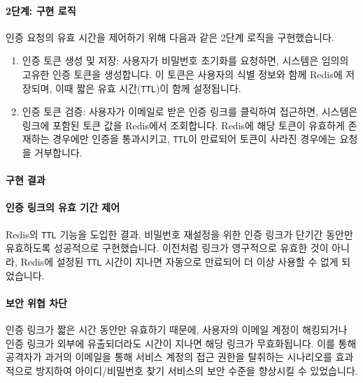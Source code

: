 \documentclass[12pt,a4paper]{article}
\begin{document}
    \paragraph{2단계: 구현 로직} \par
    인증 요청의 유효 시간을 제어하기 위해 다음과 같은 2단계 로직을 구현했습니다.\\
    \begin{enumerate}
        \item 인증 토큰 생성 및 저장: 사용자가 비밀번호 초기화를 요청하면, 시스템은 임의의 고유한 인증 토큰을 생성합니다. 이 토큰은 사용자의 식별 정보와 함께 Redis에 저장되며, 이때 짧은 유효 시간(\texttt{TTL})이 함께 설정됩니다.
        \item 인증 토큰 검증: 사용자가 이메일로 받은 인증 링크를 클릭하여 접근하면, 시스템은 링크에 포함된 토큰 값을 Redis에서 조회합니다. Redis에 해당 토큰이 유효하게 존재하는 경우에만 인증을 통과시키고, \texttt{TTL}이 만료되어 토큰이 사라진 경우에는 요청을 거부합니다.
    \end{enumerate}

    \par


    \paragraph{구현 결과}



    \paragraph{인증 링크의 유효 기간 제어} \par
    Redis의 \texttt{TTL} 기능을 도입한 결과, 비밀번호 재설정을 위한 인증 링크가 단기간 동안만 유효하도록 성공적으로 구현했습니다. 이전처럼 링크가 영구적으로 유효한 것이 아니라, Redis에 설정된 \texttt{TTL} 시간이 지나면 자동으로 만료되어 더 이상 사용할 수 없게 되었습니다.\\

    \vspace{1em}


    \paragraph{보안 위협 차단} \par
    인증 링크가 짧은 시간 동안만 유효하기 때문에, 사용자의 이메일 계정이 해킹되거나 인증 링크가 외부에 유출되더라도 시간이 지나면 해당 링크가 무효화됩니다. 이를 통해 공격자가 과거의 이메일을 통해 서비스 계정의 접근 권한을 탈취하는 시나리오를 효과적으로 방지하여 아이디/비밀번호 찾기 서비스의 보안 수준을 향상시킬 수 있었습니다.
\end{document}
